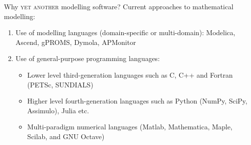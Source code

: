 \documentclass[compress,newPxFont,sthlmFooter]{beamer}
\newcommand{\skipcite}[1]{}
\begin{document}
\begin{frame}{Why \textsc{yet another} modelling software?}
Current approaches to mathematical modelling:
\begin{enumerate}
   \item Use of \alert{modelling languages} (domain-specific or multi-domain):
         \alert{Modelica}\skipcite{Fritzson-and-Engelson-1998}, 
         \alert{Ascend}\skipcite{Piela-etal-1991}, 
         \alert{gPROMS}\skipcite{Barton-and-Pantelides-1994}, 
         \alert{Dymola}\skipcite{Elmqvist-1978}, 
         \alert{APMonitor}\skipcite{APMonitor-2014}
   \item Use of \alert{general-purpose programming languages}:
      \begin{itemize}
          \item Lower level third-generation languages such as C, C++ and Fortran
                (\alert{PETSc}\skipcite{petsc}, 
                 \alert{SUNDIALS}\skipcite{Hindmarsh-etal-2005})
          \item Higher level fourth-generation languages such as \alert{Python} (NumPy, SciPy, Assimulo\skipcite{Assimulo-2015}), 
                                                                 \alert{Julia} etc.
          \item Multi-paradigm numerical languages 
                (\alert{Matlab}\skipcite{matlab}, 
                 \alert{Mathematica}\skipcite{mathematica}, 
                 \alert{Maple}\skipcite{maple}, 
                 \alert{Scilab}\skipcite{scilab}, and 
                 \alert{GNU Octave}\skipcite{octave})
      \end{itemize}
 \end{enumerate}
\end{frame}
\end{document}
